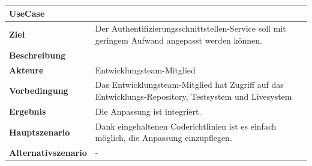 \begin{longtable}[c]{@{}ll@{}}
\toprule
\begin{minipage}[b]{0.34\columnwidth}\raggedright\strut
\textbf{UseCase}
\strut\end{minipage} &
\begin{minipage}[b]{0.60\columnwidth}\raggedright\strut
\strut\end{minipage}\tabularnewline
\midrule
\endhead
\begin{minipage}[t]{0.34\columnwidth}\raggedright\strut
\textbf{Ziel}
\strut\end{minipage} &
\begin{minipage}[t]{0.60\columnwidth}\raggedright\strut
Der Authentifizierungsschnittstellen-Service soll mit geringem Aufwand
angepasst werden können.
\strut\end{minipage}\tabularnewline
\begin{minipage}[t]{0.34\columnwidth}\raggedright\strut
\textbf{Beschreibung}
\strut\end{minipage} &
\begin{minipage}[t]{0.60\columnwidth}\raggedright\strut
\strut\end{minipage}\tabularnewline
\begin{minipage}[t]{0.34\columnwidth}\raggedright\strut
\textbf{Akteure}
\strut\end{minipage} &
\begin{minipage}[t]{0.60\columnwidth}\raggedright\strut
Entwicklungsteam-Mitglied
\strut\end{minipage}\tabularnewline
\begin{minipage}[t]{0.34\columnwidth}\raggedright\strut
\textbf{Vorbedingung}
\strut\end{minipage} &
\begin{minipage}[t]{0.60\columnwidth}\raggedright\strut
Das Entwicklungsteam-Mitglied hat Zugriff auf das
Entwicklungs-Repository, Testsystem und Livesystem
\strut\end{minipage}\tabularnewline
\begin{minipage}[t]{0.34\columnwidth}\raggedright\strut
\textbf{Ergebnis}
\strut\end{minipage} &
\begin{minipage}[t]{0.60\columnwidth}\raggedright\strut
Die Anpassung ist integriert.
\strut\end{minipage}\tabularnewline
\begin{minipage}[t]{0.34\columnwidth}\raggedright\strut
\textbf{Hauptszenario}
\strut\end{minipage} &
\begin{minipage}[t]{0.60\columnwidth}\raggedright\strut
Dank eingehaltenen Coderichtlinien ist es einfach möglich, die Anpassung
einzupflegen.
\strut\end{minipage}\tabularnewline
\begin{minipage}[t]{0.34\columnwidth}\raggedright\strut
\textbf{Alternativszenario}
\strut\end{minipage} &
\begin{minipage}[t]{0.60\columnwidth}\raggedright\strut
-
\strut\end{minipage}\tabularnewline
\bottomrule
\end{longtable}

